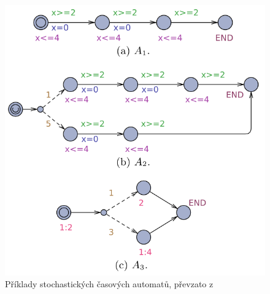 \begin{figure}[H]
  \begin{minipage}[b]{.49\linewidth}
    \centering
    \includegraphics[width=\linewidth]{obrazky-figures/sta_examples.png}
    \caption{Příklady stochastických časových automatů, převzato z \cite{uppaal_smc}}
    \label{fig:sta_examples}
  \end{minipage}
  \begin{minipage}[b]{.49\linewidth}
    \centering

\end{minipage}
\end{figure}
